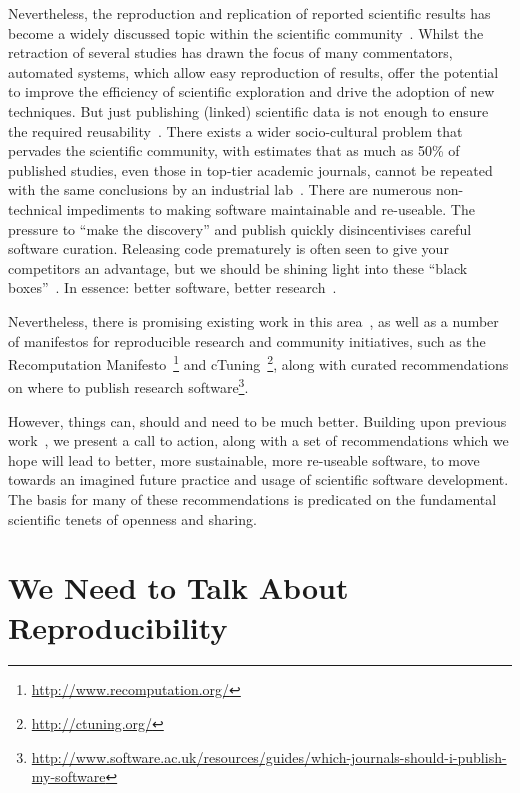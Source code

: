 \documentclass[a4paper,11pt]{article}
\begin{document}
Nevertheless, the reproduction and replication of reported scientific
results has become a widely discussed topic within the scientific
community~\cite{barnes:2010,morin-et-al:2012,joppa-et-al:2013}.
Whilst the retraction of several studies has drawn the focus of many
commentators, automated systems, which allow easy reproduction of
results, offer the potential to improve the efficiency of scientific
exploration and drive the adoption of new techniques. But just
publishing (linked) scientific data is not enough to ensure the
required reusability~\cite{bechhofer-et-al:2013}. There exists a wider
socio-cultural problem that pervades the scientific community, with
estimates that as much as 50\% of published studies, even those in
top-tier academic journals, cannot be repeated with the same
conclusions by an industrial lab~\cite{osherovich:2011}. There are
numerous non-technical impediments to making software maintainable and
re-useable. The pressure to ``make the discovery'' and publish quickly
disincentivises careful software curation. Releasing code prematurely
is often seen to give your competitors an advantage, but we should be
shining light into these ``black boxes''~\cite{morin-et-al:2012}. In
essence: better software, better research~\cite{goble:2014}.

Nevertheless, there is promising existing work in this
area~\cite{sim-et-al:2003,chirigati-et-al:2013,stodden+miguez:2014,stodden-et-al:2015},
as well as a number of manifestos for reproducible research and
community initiatives, such as the Recomputation
Manifesto~\cite{gent:2013}\footnote{\url{http://www.recomputation.org/}}
and
cTuning~\cite{fursin-et-al:2014}\footnote{\url{http://ctuning.org/}},
along with curated recommendations on where to publish research
software\footnote{\url{http://www.software.ac.uk/resources/guides/which-journals-should-i-publish-my-software}}.

However, things can, should and need to be much better. Building upon
previous work~\cite{crick-et-al_wssspe2}, we present a call to action,
along with a set of recommendations which we hope will lead to better,
more sustainable, more re-useable software, to move towards an
imagined future practice and usage of scientific software
development. The basis for many of these recommendations is predicated
on the fundamental scientific tenets of openness and sharing.

\section{We Need to Talk About Reproducibility}
\end{document}
